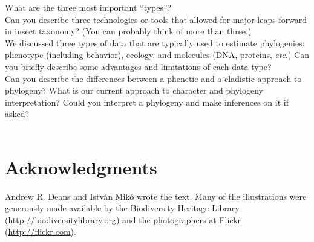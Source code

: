 \documentclass[letterpaper, 11pt]{article}
\begin{document}
\noindent{}What are the three most important ``types''?\\

\noindent{}Can you describe three technologies or tools that allowed for major leaps forward in insect taxonomy? (You can probably think of more than three.)\\

\noindent{}We discussed three types of data that are typically used to estimate phylogenies: phenotype (including behavior), ecology, and molecules (DNA, proteins, \textit{etc}.) Can you briefly describe some advantages and limitations of each data type?\\

\noindent{}Can you describe the differences between a phenetic and a cladistic approach to phylogeny? What is our current approach to character and phylogeny interpretation? Could you interpret a phylogeny and make inferences on it if asked?\\

\\

\section*{Acknowledgments}
Andrew R. Deans and Istv\'an Mik\'o wrote the text. Many of the illustrations were generously made available by the Biodiversity Heritage Library (\url{http://biodiversitylibrary.org}) and the photographers at Flickr (\url{http://flickr.com}).
\FloatBarrier


\end{document}
